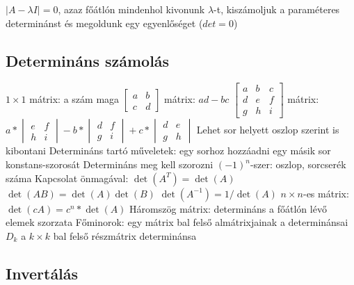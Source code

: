 \documentclass[12pt,a4paper]{article}
\begin{document}
\begin{outline}
	\1 $|A - \lambda I| = 0$, azaz főátlón mindenhol kivonunk $\lambda$-t, kiszámoljuk a paraméteres determinánst és megoldunk egy egyenlőséget ($det = 0$)
\end{outline}

\pagebreak

\subsection{Determináns számolás}

\begin{outline}
	\1 $1 \times 1$ mátrix: a szám maga
	\1 $\begin{bmatrix} a & b \\ c & d \end{bmatrix}$ mátrix: $ad - bc$
	\1 $\begin{bmatrix} a & b & c \\ d & e & f \\ g & h & i \end{bmatrix}$ mátrix:
	$a * \begin{vmatrix} e & f \\ h & i \end{vmatrix}
	- b * \begin{vmatrix} d & f \\ g & i \end{vmatrix}
	+ c * \begin{vmatrix} d & e \\ g & h \end{vmatrix}$
		\2 Lehet sor helyett oszlop szerint is kibontani
	\1 Determináns tartó műveletek:
		\2 egy sorhoz hozzáadni egy másik sor konstans-szorosát
	\1 Determináns meg kell szorozni $(-1)^n$-szer: oszlop, sorcserék száma
	\1 Kapcsolat önmagával:
		\2 $\det(A^T) = \det(A)$
		\2 $\det(AB) = \det(A) \det(B)$
		\2 $\det(A^{-1}) = 1 / \det(A)$
		\2 $n \times n$-es mátrix: $\det(cA) = c^n * \det(A)$
	\1 Háromszög mátrix: determináns a főátlón lévő elemek szorzata
	\1 Főminorok: egy mátrix bal felső almátrixjainak a determinánsai
		\2 $D_k$ a $k \times k$ bal felső részmátrix determinánsa
\end{outline}

\subsection{Invertálás}
\end{document}
